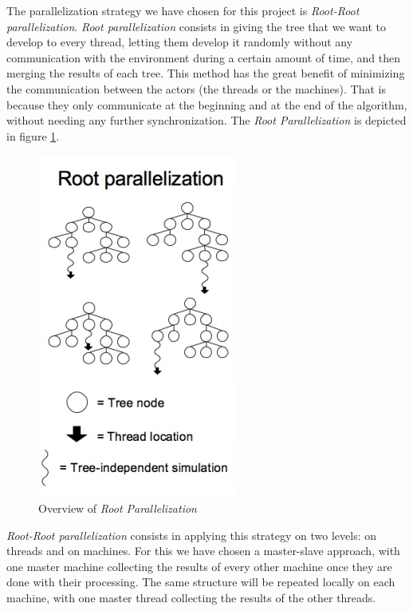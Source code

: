 The parallelization strategy we have chosen for this project is \emph{Root-Root parallelization}.
\emph{Root parallelization} consists in giving the tree that we want to develop to every thread, letting them develop it randomly without any communication with the environment during a certain amount of time, and then merging the results of each tree.
This method has the great benefit of minimizing the communication between the actors (the threads or the machines).
That is because they only communicate at the beginning and at the end of the algorithm, without needing any further synchronization.
The \textit{Root Parallelization} is depicted in figure \ref{fig:root}.

\begin{figure}[!ht] 
\centerline{\includegraphics[scale=0.5]{Parallelisation/Strategy/Img/root.png}}
   \caption{Overview of \emph{Root Parallelization} \cite{parallel_comp}}
\label{fig:root}
\end{figure}

\emph{Root-Root parallelization} consists in applying this strategy on two levels: on threads and on machines.
For this we have chosen a master-slave approach, with one master machine collecting the results of every other machine once they are done with their processing.
The same structure will be repeated locally on each machine, with one master thread collecting the results of the other threads.